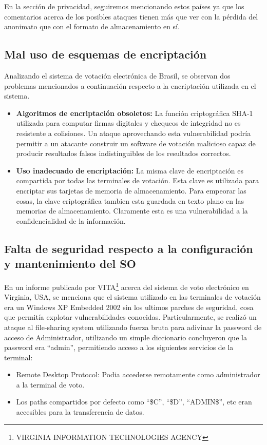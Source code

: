 En la sección de privacidad, seguiremos mencionando estos países ya que los comentarios acerca de los posibles ataques tienen más que ver con la pérdida del anonimato que con el formato de almacenamiento en sí.

\subsection{Mal uso de esquemas de encriptación}
Analizando el sistema de votación electrónica de Brasil, se observan dos problemas mencionados a continuación respecto a la encriptación utilizada en el sistema\cite{aranha}.
\begin{itemize}
	\item \textbf{Algoritmos de encriptación obsoletos:} La función criptográfica SHA-1 utilizada para computar firmas digitales y chequeos de integridad no es resistente a colisiones. Un ataque aprovechando esta vulnerabilidad podría permitir a un atacante construir un software de votación malicioso capaz de producir resultados falsos indistinguibles de los resultados correctos.
	\item \textbf{Uso inadecuado de encriptación: } La misma clave de encriptación es compartida por todas las terminales de votación. Esta clave es utilizada para encriptar sus tarjetas de memoria de almacenamiento. Para empeorar las cosas, la clave criptográfica tambien esta guardada en texto plano en las memorias de almacenamiento. Claramente esta es una vulnerabilidad a la confidencialidad de la información.
\end{itemize}


\subsection{Falta de seguridad respecto a la configuración y mantenimiento del SO}
En un informe publicado por VITA\footnote{VIRGINIA INFORMATION TECHNOLOGIES AGENCY} acerca del sistema de voto electrónico en Virginia, USA, se menciona que el sistema utilizado en las terminales de votación era un Windows XP Embedded 2002 sin los ultimos parches de seguridad, cosa que permitía explotar vulnerabilidades conocidas. Particularmente, se realizó un ataque al file-sharing system utilizando fuerza bruta para adivinar la password de acceso de Administrador, utilizando un simple diccionario concluyeron que la password era ``admin'', permitiendo acceso a los siguientes servicios de la terminal:

\begin{itemize}
	\item Remote Desktop Protocol: Podia accederse remotamente como administrador a la terminal de voto.
	\item Los paths compartidos por defecto como ``\$C'', ``\$D'', ``ADMIN\$'', etc eran accesibles para la transferencia de datos.
\end{itemize}

